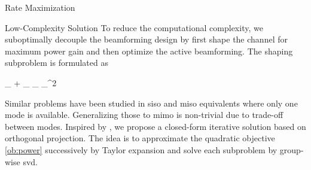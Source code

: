 \documentclass[journal]{IEEEtran}
\begin{document}
\begin{section}{Rate Maximization}
	\begin{subsection}{Low-Complexity Solution}
		\label{sc:rate_lc}
		To reduce the computational complexity, we suboptimally decouple the beamforming design by first shape the channel for maximum power gain and then optimize the active beamforming.
		The shaping subproblem is formulated as
		\begin{maxi!}
			{\scriptstyle{\mathbf{\Theta}}}{\lVert {}_ + _ \mathbf{\Theta} _ \rVert _^2}{\label{op:power}}{\label{ob:power}}
		\end{maxi!}
		Similar problems have been studied in \gls{siso} \cite{Shen2020a} and \gls{miso} equivalents \cite{Santamaria2023,Fang2023,Nerini2023,Nerini2023b} where only one mode is available. Generalizing those to \gls{mimo} is non-trivial due to trade-off between modes.
		Inspired by \cite{Nie2017}, we propose a closed-form iterative solution based on orthogonal projection.
		The idea is to approximate the quadratic objective \eqref{ob:power} successively by Taylor expansion and solve each subproblem by group-wise \gls{svd}.


\end{subsection}
\end{section}
\end{document}
